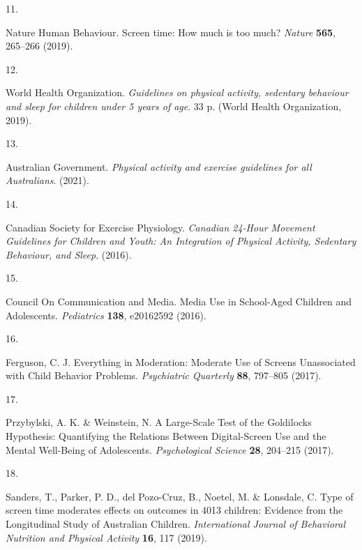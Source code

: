 \documentclass[
  english,
  man]{apa6}
\newlength{\cslhangindent}
\newlength{\csllabelwidth}
\newenvironment{CSLReferences}[2] %
 {%
  \setlength{\parindent}{0pt}
  \ifodd #1 \everypar{\setlength{\hangindent}{\cslhangindent}}\ignorespaces\fi
  \ifnum #2 > 0
  \setlength{\parskip}{#2\baselineskip}
  \fi
 }%
 {}
\newcommand{\CSLLeftMargin}[1]{\parbox[t]{\csllabelwidth}{#1}}
\newcommand{\CSLRightInline}[1]{\parbox[t]{\linewidth - \csllabelwidth}{#1}\break}
\begin{document}
\begin{CSLReferences}{0}{0}
\leavevmode{}%
\CSLLeftMargin{11. }
\CSLRightInline{Nature Human Behaviour. Screen time: How much is too much? \emph{Nature} \textbf{565}, 265--266 (2019).}

\leavevmode{}%
\CSLLeftMargin{12. }
\CSLRightInline{World Health Organization. \emph{Guidelines on physical activity, sedentary behaviour and sleep for children under 5 years of age}. 33 p. ({World Health Organization}, 2019).}

\leavevmode{}%
\CSLLeftMargin{13. }
\CSLRightInline{Australian Government. \emph{Physical activity and exercise guidelines for all {Australians}}. (2021).}

\leavevmode{}%
\CSLLeftMargin{14. }
\CSLRightInline{Canadian Society for Exercise Physiology. \emph{Canadian 24-{Hour Movement Guidelines} for {Children} and {Youth}: {An Integration} of {Physical Activity}, {Sedentary Behaviour}, and {Sleep}}. (2016).}

\leavevmode{}%
\CSLLeftMargin{15. }
\CSLRightInline{Council On Communication and Media. Media {Use} in {School-Aged Children} and {Adolescents}. \emph{Pediatrics} \textbf{138}, e20162592 (2016).}

\leavevmode{}%
\CSLLeftMargin{16. }
\CSLRightInline{Ferguson, C. J. Everything in {Moderation}: {Moderate Use} of {Screens Unassociated} with {Child Behavior Problems}. \emph{Psychiatric Quarterly} \textbf{88}, 797--805 (2017).}

\leavevmode{}%
\CSLLeftMargin{17. }
\CSLRightInline{Przybylski, A. K. \& Weinstein, N. A {Large-Scale Test} of the {Goldilocks Hypothesis}: {Quantifying} the {Relations Between Digital-Screen Use} and the {Mental Well-Being} of {Adolescents}. \emph{Psychological Science} \textbf{28}, 204--215 (2017).}

\leavevmode{}%
\CSLLeftMargin{18. }
\CSLRightInline{Sanders, T., Parker, P. D., del Pozo-Cruz, B., Noetel, M. \& Lonsdale, C. Type of screen time moderates effects on outcomes in 4013 children: Evidence from the {Longitudinal Study} of {Australian Children}. \emph{International Journal of Behavioral Nutrition and Physical Activity} \textbf{16}, 117 (2019).}


\end{CSLReferences}
\end{document}
